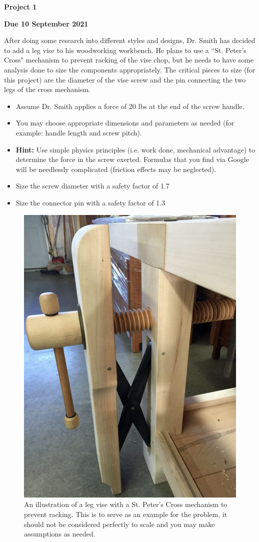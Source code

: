 \documentclass[12pt, oneside]{article}
\begin{document}
\begin{center}
\textbf{\Large Project 1}

\textbf{Due 10 September 2021}
\end{center}

After doing some research into different styles and designs, Dr. Smith has decided to add a leg vise to his woodworking workbench.
He plans to use a ``St. Peter's Cross" mechanism to prevent racking of the vise chop, but he needs to have some analysis done to size the components appropriately.
The critical pieces to size (for this project) are the diameter of the vise screw and the pin connecting the two legs of the cross mechanism.
\begin{itemize}
	\item Assume Dr. Smith applies a force of 20 lbs at the end of the screw handle.
	\item You may choose appropriate dimensions and parameters as needed (for example: handle length and screw pitch). 
	\item \textbf{Hint:} Use simple physics principles (i.e. work done, mechanical advantage) to determine the force in the screw exerted. Formulas that you find via Google will be needlessly complicated (friction effects may be neglected).
	\item Size the screw diameter with a safety factor of 1.7
	\item Size the connector pin with a safety factor of 1.3
\end{itemize}
\begin{figure}[htpb]
	\centering
	\includegraphics[width=0.4\linewidth]{../../images/stpeterscross}
	\caption{An illustration of a leg vise with a St. Peter's Cross mechanism to prevent racking. This is to serve as an example for the problem, it should not be considered perfectly to scale and you may make assumptions as needed.}
\end{figure}
\end{document}
